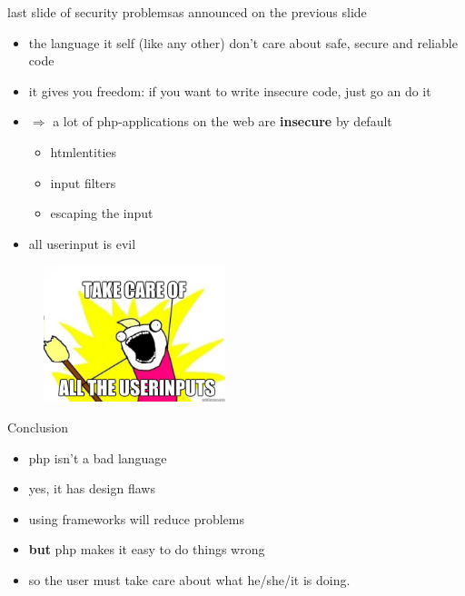 \documentclass[final]{beamer}
\begin{document}
\begin{frame}{last slide of security problems}{as announced on the previous slide}
\begin{itemize}
\item the language it self (like any other) don't care about safe, secure and reliable code
\item it gives you freedom: if you want to write insecure code, just go an do it
\item $\Rightarrow$ a lot of php-applications on the web are \textbf{insecure} by default
	\begin{itemize}
		\item htmlentities
		\item input filters
		\item escaping the input
	\end{itemize}
\item \alert<2> { all userinput is evil }
\end{itemize}
\end{frame}

\begin{frame}
\begin{center}
\begin{figure}[ht]
  \centering
	\includegraphics[height=150px]{./../graph/Meme/allthethings.jpg}
\end{figure}
\end{center}
\end{frame}



\begin{frame}{Conclusion}
\begin{itemize}
\item php isn't a bad language
\item yes, it has design flaws
\item using frameworks will reduce problems
\item \textbf{but} php makes it easy to do things wrong
\item so the user must take care about what he/she/it is doing.
\end{itemize}
\end{frame}
\end{document}
